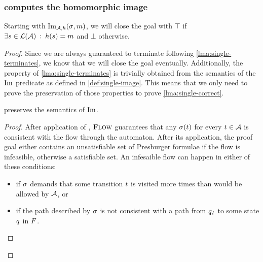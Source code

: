 \documentclass[acmsmall,review,anonymous,screen]{acmart}\settopmatter{printfolios=true,printccs=false,printacmref=true}
\theoremstyle{definition}
\begin{document}
\subsubsection{\Calculus{} computes the homomorphic image}
\begin{lemma}\label{lma:single-correct}
  Starting with $\operatorname{Im}_{\mathcal{A}, h}(\operatorname{\sigma}, m)$, we will close the goal with $\top$
  if $\exists s \in \operatorname{\mathcal{L}}(\mathcal{A}) \::\: h(s) = m$
  and $\bot$ otherwise.
\end{lemma}
\begin{proof}
Since we are always guaranteed to terminate following
\cref{lma:single-terminates}, we know that we will close the goal eventually.
Additionally, the property of \cref{lma:single-terminates} is trivially obtained
from the semantics of the $\operatorname{Im}$ predicate as defined in
\cref{def:single-image}. This means that we only need to prove the preservation
of those properties to prove \cref{lma:single-correct}.


\begin{lemma}\label{lma:expand-preserves}
  \Expand{} preserves the semantics of $\operatorname{Im}$.
\end{lemma}
\begin{proof}

  After application of \Expand{}, $\textsc{Flow}$ guarantees that any
  $\operatorname{\sigma}(t)$  for every $t \in \mathcal{A}$ is consistent
  with the flow through the automaton. After its application, the proof goal
  either contains an unsatisfiable set of Presburger formulae if the flow is
  infeasible, otherwise a satisfiable set. An infesaible flow can happen in
  either of these conditions:
  \begin{itemize}
    \item if $\operatorname{\sigma}$ demands that some transition $t$ is visited more times than would be allowed by $\mathcal{A}$, or
    \item if the path described by $\operatorname{\sigma}$ is not consistent with a path from
    $q_I$ to some state $q$ in $F$.
  \end{itemize}


\end{proof}
\end{proof}
\end{document}
